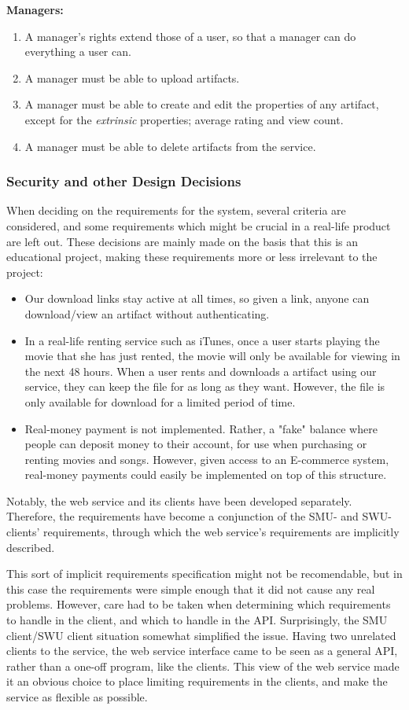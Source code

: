 \textbf{Managers:}
\begin{enumerate}
\setcounter{enumi}{\theenumTemp}
\item A manager's rights extend those of a user, so that a manager can do
	everything a user can.
\item A manager must be able to upload artifacts.
\item A manager must be able to create and edit the properties of any artifact,
	except for the \emph{extrinsic} properties; average rating and view
	count.
\item A manager must be able to delete artifacts from the service.
\end{enumerate}

\subsubsection{Security and other Design Decisions}
When deciding on the requirements for the system, several criteria are
considered, and some requirements which might be crucial in a real-life product
are left out. These decisions are mainly made on the basis that this is an
educational project, making these requirements more or less irrelevant to the
project:

\begin{itemize}
\item Our download links stay active at all times, so given a link, 
	anyone can download/view an artifact without authenticating.
\item In a real-life renting service such as iTunes, once a user starts playing
	the movie that she has just rented, the movie will only be available
	for viewing in the next 48 hours. When a user rents and downloads a
	artifact using our service, they can keep the file for as long as they
	want. However, the file is only available for download for a limited
	period of time.
\item Real-money payment is not implemented. Rather, a "fake" balance where
	people can deposit money to their account, for use when purchasing or
	renting movies and songs. However, given access to an E-commerce
	system, real-money payments could easily be implemented on top of this
	structure.
\end{itemize}

Notably, the web service and its clients have been developed separately.
Therefore, the requirements have become a conjunction of the SMU- and
SWU-clients' requirements, through which the web service's requirements are
implicitly described.

This sort of implicit requirements specification might not be recomendable, but
in this case the requirements were simple enough that it did not cause any real
problems. However, care had to be taken when determining which requirements to
handle in the client, and which to handle in the API. Surprisingly, the SMU
client/SWU client situation somewhat simplified the issue. Having two unrelated
clients to the service, the web service interface came to be seen as a general
API, rather than a one-off program, like the clients. This view of the web
service made it an obvious choice to place limiting requirements in the
clients, and make the service as flexible as possible.
